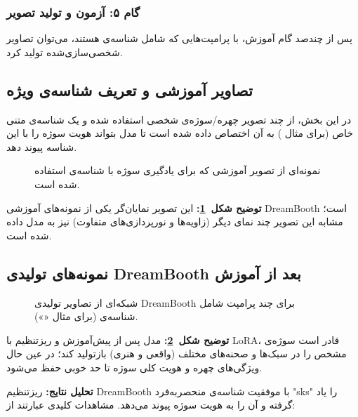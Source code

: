 \subsubsection*{گام ۵: آزمون و تولید تصویر}
پس از چندصد گام آموزش، با پرامپت‌هایی که شامل شناسه‌ی  هستند، می‌توان تصاویر شخصی‌سازی‌شده تولید کرد.

\subsection{تصاویر آموزشی و تعریف شناسه‌ی ویژه}

در این بخش، از چند تصویر چهره/سوژه‌ی شخصی استفاده شده و یک شناسه‌ی متنی خاص (برای مثال )
به آن اختصاص داده شده است تا مدل بتواند هویت سوژه را با این شناسه پیوند دهد.

\begin{figure}[H]
    \centering
    \caption{نمونه‌ای از تصویر آموزشی که برای یادگیری سوژه با شناسه‌ی  استفاده شده است.}
    \label{fig:dreambooth-train}
\end{figure}

\noindent\textbf{توضیح شکل~\ref{fig:dreambooth-train}:}
این تصویر نمایان‌گر یکی از نمونه‌های آموزشی DreamBooth است؛ مشابه این تصویر چند نمای دیگر (زاویه‌ها و نورپردازی‌های متفاوت) نیز به مدل داده شده است.

\subsection{نمونه‌های تولیدی DreamBooth بعد از آموزش}

\begin{figure}[H]
    \centering
    \caption{شبکه‌ای از تصاویر تولیدی DreamBooth برای چند پرامپت شامل شناسه‌ی  (برای مثال «»).}
    \label{fig:dreambooth-gen}
\end{figure}

\noindent\textbf{توضیح شکل~\ref{fig:dreambooth-gen}:}
مدل پس از پیش‌آموزش و ریزتنظیم با LoRA، قادر است سوژه‌ی مشخص را در سبک‌ها و صحنه‌های مختلف (واقعی و هنری) بازتولید کند؛ در عین حال ویژگی‌های چهره و هویت کلی سوژه تا حد خوبی حفظ می‌شود.

\noindent\textbf{تحلیل نتایج:}
ریزتنظیم DreamBooth با موفقیت شناسه‌ی منحصربه‌فرد "sks" را یاد گرفته و آن را به هویت سوژه پیوند می‌دهد. مشاهدات کلیدی عبارتند از:

